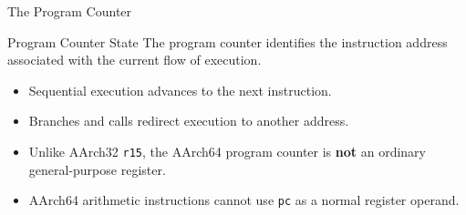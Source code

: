 \documentclass[aspectratio=169,11pt,t]{beamer}
\newcommand{\key}[1]{\textbf{#1}}
\newcommand{\code}[1]{\texttt{#1}}
\begin{document}
\begin{frame}{The Program Counter}

\begin{block}{Program Counter State}
The program counter identifies
the instruction address
associated with the current flow
of execution.
\end{block}

\vspace{0.15cm}

\begin{itemize}
  \item Sequential execution advances
        to the next instruction.
  \item Branches and calls redirect execution
        to another address.
  \item Unlike AArch32 \code{r15},
        the AArch64 program counter
        is \key{not}
        an ordinary general-purpose register.
  \item AArch64 arithmetic instructions
        cannot use \code{pc}
        as a normal register operand.
\end{itemize}

\end{frame}



\end{document}
